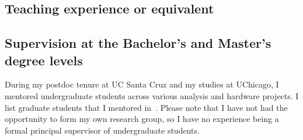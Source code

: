 \subsection{Teaching experience or equivalent}\label{ssec:teaching-experience-or-equivalent}
\subsection{Supervision at the Bachelor’s and Master’s degree levels}\label{ssec:supervision-at-the-bachelor-s-and-master-s-degree-levels}

During my postdoc tenure at UC Santa Cruz and my studies at UChicago, I mentored undergraduate students across various analysis and hardware projects. I list graduate students that I mentored in~. Please note that I have not had the opportunity to form my own research group, so I have no experience being a formal principal supervisor of undergraduate students.

